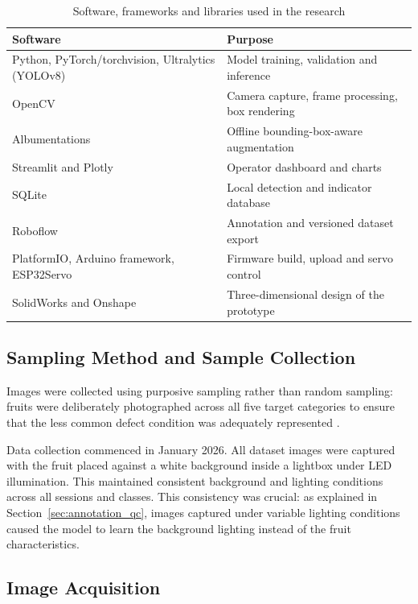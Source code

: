 \begin{table}[H]
\caption{Software, frameworks and libraries used in the research}
\label{tab:software}
\centering
\begin{tabularx}{\textwidth}{>{\raggedright\arraybackslash}p{4.5cm} >{\raggedright\arraybackslash}X}
\toprule
\textbf{Software} & \textbf{Purpose} \\
\midrule
Python, PyTorch/torchvision, Ultralytics (YOLOv8) & Model training, validation and inference \\
OpenCV & Camera capture, frame processing, box rendering \\
Albumentations & Offline bounding-box-aware augmentation \\
Streamlit and Plotly & Operator dashboard and charts \\
SQLite & Local detection and indicator database \\
Roboflow & Annotation and versioned dataset export \\
PlatformIO, Arduino framework, ESP32Servo & Firmware build, upload and servo control \\
SolidWorks and Onshape & Three-dimensional design of the prototype \\
\bottomrule
\end{tabularx}
\end{table}




\subsection{Sampling Method and Sample Collection}
\label{sec:m_sampling}

Images were collected using purposive sampling rather than random sampling: fruits were deliberately photographed across all five target categories to ensure that the less common defect condition was adequately represented \citep{etikan2016}.

Data collection commenced in January 2026. All dataset images were captured with the fruit placed against a white background inside a lightbox under \acrshort{LED} illumination. This maintained consistent background and lighting conditions across all sessions and classes. This consistency was crucial: as explained in Section~\ref{sec:annotation_qc}, images captured under variable lighting conditions caused the model to learn the background lighting instead of the fruit characteristics.

\subsection{Image Acquisition}
\label{sec:m_acquisition}

